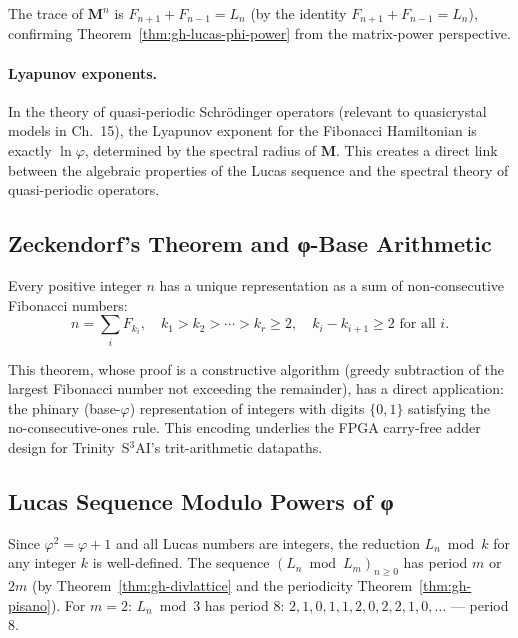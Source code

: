 The trace of \(\mathbf{M}^n\) is \(F_{n+1} + F_{n-1} = L_n\)
(by the identity \(F_{n+1} + F_{n-1} = L_n\)),
confirming Theorem~\ref{thm:gh-lucas-phi-power} from the
matrix-power perspective.

\paragraph{Lyapunov exponents.}
In the theory of quasi-periodic Schrödinger operators (relevant to
quasicrystal models in Ch.~15), the Lyapunov exponent for the
Fibonacci Hamiltonian is exactly \(\ln\varphi\), determined by the
spectral radius of \(\mathbf{M}\).  This creates a direct link between
the algebraic properties of the Lucas sequence and the spectral theory
of quasi-periodic operators.

\subsection{Zeckendorf's Theorem and φ-Base Arithmetic}
\label{subsec:gh-zeckendorf}

\begin{theorem}[Zeckendorf, 1972]
\label{thm:gh-zeckendorf}
Every positive integer \(n\) has a unique representation as a sum of
non-consecutive Fibonacci numbers:
\begin{equation}\label{eq:gh-zeckendorf}
  n = \sum_{i} F_{k_i}, \quad k_1 > k_2 > \cdots > k_r \geq 2,
  \quad k_i - k_{i+1} \geq 2 \text{ for all } i.
\end{equation}
\end{theorem}

This theorem, whose proof is a constructive algorithm (greedy
subtraction of the largest Fibonacci number not exceeding the remainder),
has a direct application: the phinary (base-\(\varphi\)) representation
of integers with digits \(\{0,1\}\) satisfying the no-consecutive-ones
rule.  This encoding underlies the FPGA carry-free adder design for
Trinity~S$^3$AI's trit-arithmetic datapaths.

\subsection{Lucas Sequence Modulo Powers of φ}
\label{subsec:gh-lucas-mod-phi}

Since \(\varphi^2 = \varphi + 1\) and all Lucas numbers are integers,
the reduction \(L_n \bmod k\) for any integer \(k\) is well-defined.
The sequence \((L_n \bmod L_m)_{n \geq 0}\) has period \(m\) or \(2m\)
(by Theorem~\ref{thm:gh-divlattice} and the periodicity
Theorem~\ref{thm:gh-pisano}).
For \(m = 2\): \(L_n \bmod 3\) has period \(8\):
\(2,1,0,1,1,2,0,2,2,1,0,\ldots\) — period 8.

